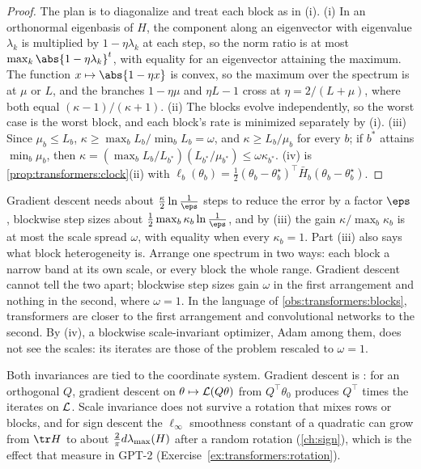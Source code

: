 \begin{refsection}
\begin{proof}
The plan is to diagonalize and treat each block as in (i). (i) In an orthonormal eigenbasis of $H$, the component along an eigenvector with eigenvalue $\lambda_k$ is multiplied by $1-\eta\lambda_k$ at each step, so the norm ratio is at most $\max_k\abs{1-\eta\lambda_k}^t$, with equality for an eigenvector attaining the maximum. The function $x\mapsto\abs{1-\eta x}$ is convex, so the maximum over the spectrum is at $\mu$ or $L$, and the branches $1-\eta\mu$ and $\eta L-1$ cross at $\eta=2/(L+\mu)$, where both equal $(\kappa-1)/(\kappa+1)$. (ii) The blocks evolve independently, so the worst case is the worst block, and each block's rate is minimized separately by (i). (iii) Since $\mu_b\le L_b$, $\kappa\ge\max_bL_b/\min_bL_b=\omega$, and $\kappa\ge L_b/\mu_b$ for every $b$; if $b^*$ attains $\min_b\mu_b$, then $\kappa=(\max_bL_b/L_{b^*})(L_{b^*}/\mu_{b^*})\le\omega\kappa_{b^*}$. (iv) is \cref{prop:transformers:clock}(ii) with $\ell_b(\theta_b)=\frac12(\theta_b-\theta_b^\star)^\top\bar H_b(\theta_b-\theta_b^\star)$.
\end{proof}

Gradient descent needs about $\frac\kappa2\ln\frac1\eps$ steps to reduce the error by a factor $\eps$, blockwise step sizes about $\frac12\max_b\kappa_b\ln\frac1\eps$, and by (iii) the gain $\kappa/\max_b\kappa_b$ is at most the scale spread $\omega$, with equality when every $\kappa_b=1$. Part (iii) also says what block heterogeneity is. Arrange one spectrum in two ways: each block a narrow band at its own scale, or every block the whole range. Gradient descent cannot tell the two apart; blockwise step sizes gain $\omega$ in the first arrangement and nothing in the second, where $\omega=1$. In the language of \cref{obs:transformers:blocks}, transformers are closer to the first arrangement and convolutional networks to the second. By (iv), a blockwise scale-invariant optimizer, Adam among them, does not see the scales: its iterates are those of the problem rescaled to $\omega=1$.

Both invariances are tied to the coordinate system. Gradient descent is : for an orthogonal $Q$, gradient descent on $\theta\mapsto\mathcal{L}(Q\theta)$ from $Q^\top\theta_0$ produces $Q^\top$ times the iterates on $\mathcal{L}$. Scale invariance does not survive a rotation that mixes rows or blocks, and for sign descent the $\ell_\infty$ smoothness constant of a quadratic can grow from $\tr H$ to about $\frac2\pi d\lambda_{\max}(H)$ after a random rotation (\cref{ch:sign}), which is the effect that \textcite{XieEtAl2025} measure in GPT-2 (Exercise~\ref{ex:transformers:rotation}).


\end{refsection}
